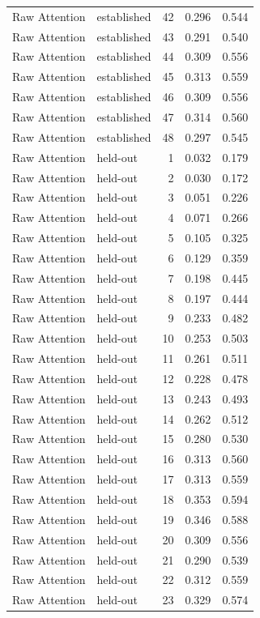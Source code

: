 \begin{tabular}{llrrr}
Raw Attention & established & 42 & 0.296 & 0.544 \\
Raw Attention & established & 43 & 0.291 & 0.540 \\
Raw Attention & established & 44 & 0.309 & 0.556 \\
Raw Attention & established & 45 & 0.313 & 0.559 \\
Raw Attention & established & 46 & 0.309 & 0.556 \\
Raw Attention & established & 47 & 0.314 & 0.560 \\
Raw Attention & established & 48 & 0.297 & 0.545 \\
Raw Attention & held-out & 1 & 0.032 & 0.179 \\
Raw Attention & held-out & 2 & 0.030 & 0.172 \\
Raw Attention & held-out & 3 & 0.051 & 0.226 \\
Raw Attention & held-out & 4 & 0.071 & 0.266 \\
Raw Attention & held-out & 5 & 0.105 & 0.325 \\
Raw Attention & held-out & 6 & 0.129 & 0.359 \\
Raw Attention & held-out & 7 & 0.198 & 0.445 \\
Raw Attention & held-out & 8 & 0.197 & 0.444 \\
Raw Attention & held-out & 9 & 0.233 & 0.482 \\
Raw Attention & held-out & 10 & 0.253 & 0.503 \\
Raw Attention & held-out & 11 & 0.261 & 0.511 \\
Raw Attention & held-out & 12 & 0.228 & 0.478 \\
Raw Attention & held-out & 13 & 0.243 & 0.493 \\
Raw Attention & held-out & 14 & 0.262 & 0.512 \\
Raw Attention & held-out & 15 & 0.280 & 0.530 \\
Raw Attention & held-out & 16 & 0.313 & 0.560 \\
Raw Attention & held-out & 17 & 0.313 & 0.559 \\
Raw Attention & held-out & 18 & 0.353 & 0.594 \\
Raw Attention & held-out & 19 & 0.346 & 0.588 \\
Raw Attention & held-out & 20 & 0.309 & 0.556 \\
Raw Attention & held-out & 21 & 0.290 & 0.539 \\
Raw Attention & held-out & 22 & 0.312 & 0.559 \\
Raw Attention & held-out & 23 & 0.329 & 0.574 \\

\end{tabular}
